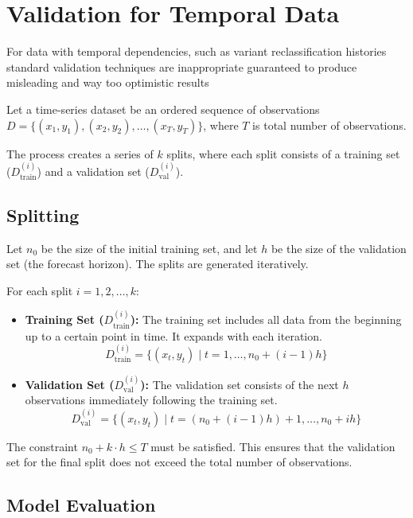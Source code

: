 \documentclass[../main.tex]{subfiles}
\begin{document}
\section{Validation for Temporal Data}
For data with temporal dependencies, such as variant reclassification histories standard validation techniques are inappropriate guaranteed to produce misleading and  way too optimistic results

Let a time-series dataset be an ordered sequence of observations $D = \{ (x_1, y_1), (x_2, y_2), \dots, (x_T, y_T) \}$, where $T$ is total number of observations.

The process creates a series of $k$ splits, where each split consists of a training set ($D_{\text{train}}^{(i)}$) and a validation set ($D_{\text{val}}^{(i)}$).

\subsection*{Splitting}

Let $n_0$ be the size of the initial training set, and let $h$ be the size of the validation set (the forecast horizon). The splits are generated iteratively.

For each split $i = 1, 2, \dots, k$:

\begin{itemize}
    \item \textbf{Training Set ($D_{\text{train}}^{(i)}$):} The training set includes all data from the beginning up to a certain point in time. It expands with each iteration.
    \begin{equation}
        D_{\text{train}}^{(i)} = \{ (x_t, y_t) \mid t = 1, \dots, n_0 + (i-1)h \}
    \end{equation}

    \item \textbf{Validation Set ($D_{\text{val}}^{(i)}$):} The validation set consists of the next $h$ observations immediately following the training set.
    \begin{equation}
        D_{\text{val}}^{(i)} = \{ (x_t, y_t) \mid t = (n_0 + (i-1)h) + 1, \dots, n_0 + ih \}
    \end{equation}
\end{itemize}

The constraint $n_0 + k \cdot h \le T$ must be satisfied. This ensures that the validation set for the final split does not exceed the total number of observations.

\subsection*{Model Evaluation}
\end{document}
